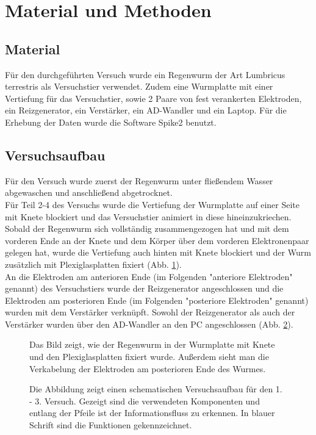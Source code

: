 \documentclass[11pt]{article}
\begin{document}
\section{Material und Methoden}
\subsection{Material}
Für den durchgeführten Versuch wurde ein Regenwurm der Art Lumbricus terrestris als Versuchstier verwendet. Zudem eine Wurmplatte mit einer Vertiefung für das Versuchstier, sowie 2 Paare von fest verankerten Elektroden, ein Reizgenerator, ein Verstärker, ein AD-Wandler und ein Laptop. Für die Erhebung der Daten wurde die Software Spike2 benutzt.
\subsection{Versuchsaufbau}
Für den Versuch wurde zuerst der Regenwurm unter fließendem Wasser abgewaschen und anschließend abgetrocknet.\\
Für Teil 2-4 des Versuchs wurde die Vertiefung der Wurmplatte auf einer Seite mit Knete blockiert und das Versuchstier animiert in diese hineinzukriechen. Sobald der Regenwurm sich vollständig zusammengezogen hat und mit dem vorderen Ende an der Knete und dem Körper über dem vorderen Elektronenpaar gelegen hat, wurde die Vertiefung auch hinten mit Knete blockiert und der Wurm zusätzlich mit Plexiglasplatten fixiert (Abb. \ref{foto}). \\
An die Elektroden am anterioren Ende (im Folgenden "{}anteriore Elektroden"{} genannt) des Versuchstiers wurde der Reizgenerator angeschlossen und die Elektroden am posterioren Ende (im Folgenden "{}posteriore Elektroden"{} genannt) wurden mit dem Verstärker verknüpft. Sowohl der Reizgenerator als auch der Verstärker wurden über den AD-Wandler an den PC angeschlossen (Abb. \ref{schema}).
\begin{figure}[H]
\caption{Das Bild zeigt, wie der Regenwurm in der Wurmplatte mit Knete und den Plexiglasplatten fixiert wurde. Außerdem sieht man die Verkabelung der Elektroden am posterioren Ende des Wurmes. }
\label{foto}
\end{figure}
\begin{figure}[H]
\caption{Die Abbildung zeigt einen schematischen Versuchsaufbau für den 1. - 3. Versuch. Gezeigt sind die verwendeten Komponenten und entlang der Pfeile ist der Informationsfluss zu erkennen. In blauer Schrift sind die Funktionen gekennzeichnet. }
\label{schema}
\end{figure}
\end{document}

